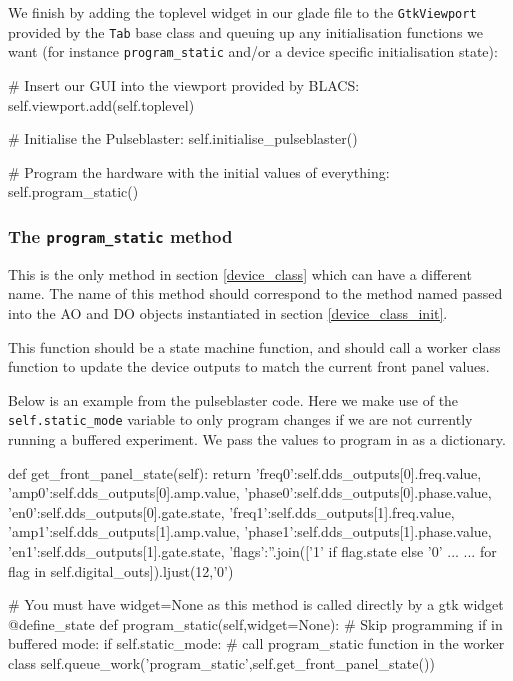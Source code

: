 \documentclass[12pt]{article}
\begin{document}
We finish by adding the toplevel widget in our glade file to the \texttt{GtkViewport} provided by the \texttt{Tab} base class and queuing up any initialisation functions we want (for instance \texttt{program\_static} and/or a device specific initialisation state):

\begin{python}
        # Insert our GUI into the viewport provided by BLACS:
        self.viewport.add(self.toplevel)
        
        # Initialise the Pulseblaster:
        self.initialise_pulseblaster()
        
        # Program the hardware with the initial values of everything:
        self.program_static()
\end{python}

\subsubsection{The \texttt{program\_static} method} \label{device_class_program_static}
This is the only method in section \ref{device_class} which can have a different name. The name of this method should correspond to the method named passed into the AO and DO objects instantiated in section \ref{device_class_init}.

This function should be a state machine function, and should call a worker class function to update the device outputs to match the current front panel values.

Below is an example from the pulseblaster code. Here we make use of the \texttt{self.static\_mode} variable to only program changes if we are not currently running a buffered experiment. We pass the values to program in as a dictionary.

\begin{python}
    def get_front_panel_state(self):
        return {'freq0':self.dds_outputs[0].freq.value,
                'amp0':self.dds_outputs[0].amp.value,
                'phase0':self.dds_outputs[0].phase.value,
                'en0':self.dds_outputs[0].gate.state,
                'freq1':self.dds_outputs[1].freq.value,
                'amp1':self.dds_outputs[1].amp.value,
                'phase1':self.dds_outputs[1].phase.value,
                'en1':self.dds_outputs[1].gate.state,
                'flags':''.join(['1' if flag.state else '0' ...
                ... for flag in self.digital_outs]).ljust(12,'0')}
    
    # You must have widget=None as this method is called directly by a gtk widget
    @define_state
    def program_static(self,widget=None):
        # Skip programming if in buffered mode:
        if self.static_mode:
        	# call program_static function in the worker class
            self.queue_work('program_static',self.get_front_panel_state())
\end{python}
\end{document}
